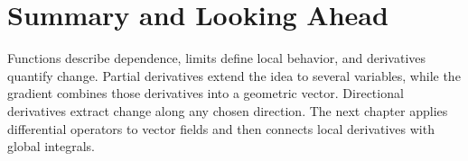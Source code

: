 \section{Summary and Looking Ahead}
Functions describe dependence, limits define local behavior, and derivatives quantify change. Partial derivatives extend the idea to several variables, while the gradient combines those derivatives into a geometric vector. Directional derivatives extract change along any chosen direction. The next chapter applies differential operators to vector fields and then connects local derivatives with global integrals.
